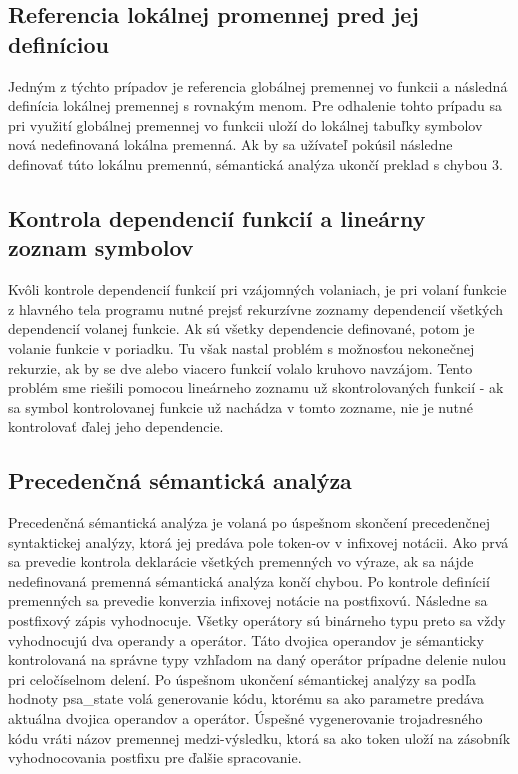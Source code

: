 \documentclass{article}
\begin{document}
	\subsection{Referencia lokálnej promennej pred jej definíciou}
	Jedným z týchto prípadov je referencia globálnej premennej vo funkcii a následná definícia lokálnej premennej s rovnakým menom. Pre odhalenie tohto prípadu sa pri využití globálnej premennej vo funkcii uloží do lokálnej tabuľky symbolov nová nedefinovaná lokálna premenná. Ak by sa užívateľ pokúsil následne definovať túto lokálnu premennú, sémantická analýza ukončí preklad s chybou 3.
	\subsection{Kontrola dependencií funkcií a lineárny zoznam symbolov}
	Kvôli kontrole dependencií funkcií pri vzájomných volaniach, je pri volaní funkcie z hlavného tela programu nutné prejsť rekurzívne zoznamy dependencií všetkých dependencií volanej funkcie. Ak sú všetky dependencie definované, potom je volanie funkcie v poriadku. Tu však nastal problém s možnosťou nekonečnej rekurzie, ak by se dve alebo viacero funkcií volalo kruhovo navzájom.
	Tento problém sme riešili pomocou lineárneho zoznamu už skontrolovaných funkcií - ak sa symbol kontrolovanej funkcie už nachádza v tomto zozname, nie je nutné kontrolovať ďalej jeho dependencie.
	
	\subsection{Precedenčná sémantická analýza}
	Precedenčná sémantická analýza je volaná po úspešnom skončení precedenčnej syntaktickej analýzy, ktorá jej predáva pole token-ov v infixovej notácii. Ako prvá sa prevedie kontrola deklarácie všetkých premenných vo výraze, ak sa nájde nedefinovaná premenná sémantická analýza končí chybou. Po kontrole definícií premenných sa prevedie konverzia infixovej notácie na postfixovú. Následne sa postfixový zápis vyhodnocuje. Všetky operátory sú binárneho typu preto sa vždy vyhodnocujú dva operandy a operátor. Táto dvojica operandov je sémanticky kontrolovaná na správne typy vzhľadom na  daný operátor prípadne delenie nulou pri celočíselnom delení. Po úspešnom ukončení sémantickej analýzy sa podľa hodnoty psa\_state volá generovanie kódu, ktorému sa ako parametre predáva aktuálna dvojica operandov a operátor. Úspešné vygenerovanie trojadresného kódu vráti názov premennej medzi-výsledku, ktorá sa ako token uloží na zásobník vyhodnocovania postfixu pre ďalšie spracovanie.
\end{document}
